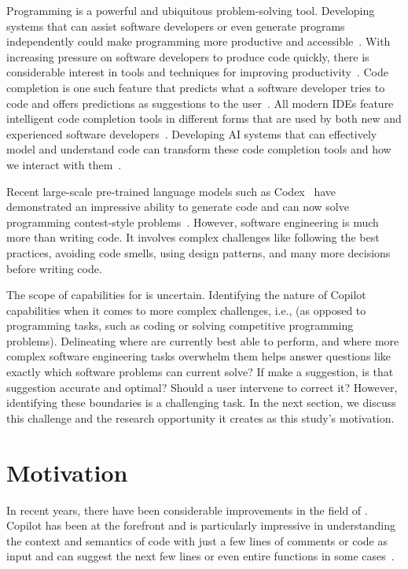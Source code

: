 \label{chapter:introduction}
Programming is a powerful and ubiquitous problem-solving tool. Developing systems that can assist software developers or even generate programs independently could make programming more productive and accessible~\cite{peggyprod}.
With increasing pressure on software developers to produce code quickly, there is considerable interest in tools and techniques for improving productivity~\cite{productivity}.
Code completion is one such feature that predicts what a software developer tries to code and offers predictions as suggestions to the user~\cite{cct}. All modern IDEs feature intelligent code completion tools in different forms that are used by both new and experienced software developers~\cite{cct_usage}. Developing AI systems that can effectively model and understand code can transform these code completion tools and how we interact with them~\cite{cct_usage}.

Recent large-scale pre-trained language models such as Codex~\cite{copilot} have demonstrated an impressive ability to generate code and can now solve programming contest-style problems~\cite{empirical_eval}. 
However, software engineering is much more than writing code. It involves complex challenges like following the best practices, avoiding code smells, using design patterns, and many more decisions before writing code.

The scope of capabilities for \cct{} is uncertain. Identifying the nature of Copilot capabilities when it comes to more complex challenges, i.e., \AISE{} (as opposed to programming tasks, such as coding or solving competitive programming problems). Delineating where \cct{} are currently best able to perform, and where more complex software engineering tasks overwhelm them helps answer questions like exactly which software problems can current \cct{} solve? 
If \cct{} make a suggestion, is that suggestion accurate and optimal? Should a user intervene to correct it? However, identifying these boundaries is a challenging task. In the next section, we discuss this challenge and the research opportunity it creates as this study's motivation.

\section{Motivation}
In recent years, there have been considerable improvements in the field of \cct{}. 
Copilot has been at the forefront and is particularly impressive in understanding the context and semantics of code with just a few lines of comments or code as input and can suggest the next few lines or even entire functions in some cases~\cite{copilot}.

